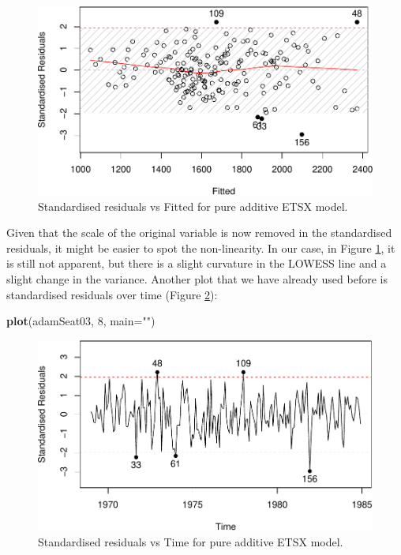 \documentclass[]{book}
\newenvironment{Shaded}{\begin{snugshade}}{\end{snugshade}}
\newcommand{\DataTypeTok}[1]{\textcolor[rgb]{0.13,0.29,0.53}{#1}}
\newcommand{\DecValTok}[1]{\textcolor[rgb]{0.00,0.00,0.81}{#1}}
\newcommand{\KeywordTok}[1]{\textcolor[rgb]{0.13,0.29,0.53}{\textbf{#1}}}
\newcommand{\NormalTok}[1]{#1}
\newcommand{\StringTok}[1]{\textcolor[rgb]{0.31,0.60,0.02}{#1}}
\theoremstyle{definition}
\theoremstyle{definition}
\theoremstyle{definition}
\theoremstyle{definition}
\theoremstyle{remark}
\begin{document}
\begin{figure}
\centering
\includegraphics{Svetunkov--2022----ADAM_files/figure-latex/adamSeat03Resid-1.pdf}
\caption{\label{fig:adamSeat03Resid}Standardised residuals vs Fitted for pure additive ETSX model.}
\end{figure}

Given that the scale of the original variable is now removed in the standardised residuals, it might be easier to spot the non-linearity. In our case, in Figure \ref{fig:adamSeat03Resid}, it is still not apparent, but there is a slight curvature in the LOWESS line and a slight change in the variance. Another plot that we have already used before is standardised residuals over time (Figure \ref{fig:adamSeat03ResidTime}):

\begin{Shaded}
\begin{Highlighting}[]
\KeywordTok{plot}\NormalTok{(adamSeat03, }\DecValTok{8}\NormalTok{, }\DataTypeTok{main=}\StringTok{""}\NormalTok{)}
\end{Highlighting}
\end{Shaded}

\begin{figure}
\centering
\includegraphics{Svetunkov--2022----ADAM_files/figure-latex/adamSeat03ResidTime-1.pdf}
\caption{\label{fig:adamSeat03ResidTime}Standardised residuals vs Time for pure additive ETSX model.}
\end{figure}
\end{document}
